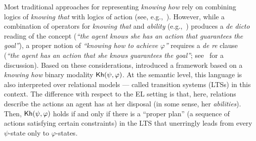 Most traditional approaches for representing \emph{knowing how} rely on combining logics of \emph{knowing that} with logics of action (see, e.g.,~\cite{Mccarthy69,Les00,HerzigT06}). However, while a combination of operators for \emph{knowing that} and \emph{ability} (e.g.,~\cite{wiebeetal:2003}) produces a \emph{de dicto} reading of the concept (\emph{``the agent knows she has an action that guarantees the goal''}), a proper notion of \emph{``knowing how to achieve $\varphi$''} requires a \emph{de re} clause (\emph{``the agent has an action that she knows guarantees the goal''}; see~\cite{JamrogaA07,Herzig15} for a discussion). Based on these considerations, \cite{Wang15lori,Wang2016} introduced a framework based on a \emph{knowing how} binary modality ${\sf Kh}(\psi,\varphi)$. At the semantic level, this language is also interpreted over relational models --- called transition systems (LTSs) in this context. The difference with respect to the EL setting is that, here, relations describe the actions an agent has at her disposal (in some sense, her \emph{abilities}).
Then, ${\sf Kh}(\psi,\varphi)$ holds if and only if there is a ``proper plan'' (a sequence of actions satisfying certain constraints) in the LTS that unerringly leads from every $\psi$-state only to $\varphi$-states.


